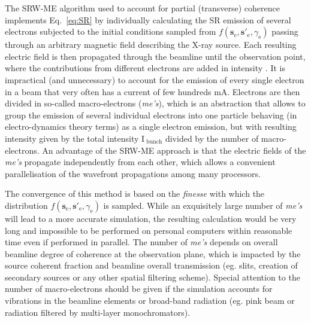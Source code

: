 \documentclass{iucr}              %
\begin{document}
The SRW-ME algorithm used to account for partial (transverse) coherence implements Eq.~\ref{eq:SR} by individually calculating the SR emission of several electrons subjected to the initial conditions sampled from $f(\textbf{s}_\text{e}, \textbf{s}'_\text{e}, \gamma_\text{e})$ passing through an arbitrary magnetic field describing the X-ray source. Each resulting electric field is then propagated through the beamline until the observation point, where the contributions from different electrons are added in intensity \cite{codeSRW_ME}. It is impractical (and unnecessary) to account for the emission of every single electron in a beam that very often has a current of few hundreds mA. Electrons are then divided in so-called macro-electrons (\textit{me's}), which is an abstraction that allows to group the emission of several individual electrons into one particle behaving (in electro-dynamics theory terms) as a single electron emission, but with resulting intensity given by the total intensity $\text{I}_\text{~bunch}$ divided by the number of macro-electrons. An advantage of the SRW-ME approach is that the electric fields of the \textit{me's} propagate independently from each other, which allows a convenient parallelisation of the wavefront propagations among many processors.

The convergence of this method is based on the \textit{finesse} with which the distribution $f(\textbf{s}_\text{e}, \textbf{s}'_\text{e}, \gamma_\text{e})$ is sampled. While an exquisitely large number of \textit{me's} will lead to a more accurate simulation, the resulting calculation would be very long and impossible to be performed on personal computers within reasonable time even if performed in parallel. The number of \textit{me's} depends on overall beamline degree of coherence at the observation plane, which is impacted by the source coherent fraction and beamline overall transmission (eg. slits, creation of secondary sources or any other spatial filtering scheme). Special attention to the number of macro-electrons should be given if the simulation accounts for vibrations in the beamline elements or broad-band radiation (eg. pink beam or radiation filtered by multi-layer monochromators).
\end{document}
